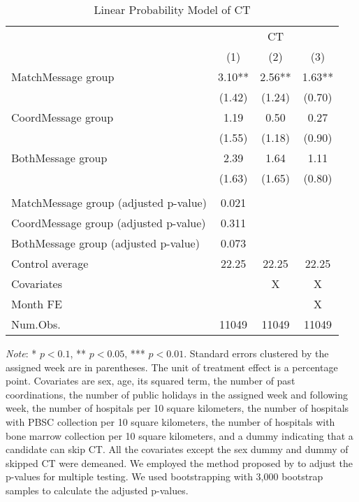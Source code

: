 \documentclass[12pt, a4paper]{article}
\begin{document}
\begin{table}[H]

\caption{\label{tab:lm-test}Linear Probability Model of CT}
\centering
\fontsize{8}{10}\selectfont
\begin{threeparttable}
\begin{tabular}[t]{>{\raggedright\arraybackslash}p{20em}ccc}
\toprule
\multicolumn{1}{c}{ } & \multicolumn{3}{c}{CT} \\
\cmidrule(l{3pt}r{3pt}){2-4}
  & (1) & (2) & (3)\\
\midrule
MatchMessage group & \num{3.10}** & \num{2.56}** & \num{1.63}**\\
 & (\num{1.42}) & (\num{1.24}) & (\num{0.70})\\
CoordMessage group & \num{1.19} & \num{0.50} & \num{0.27}\\
 & (\num{1.55}) & (\num{1.18}) & (\num{0.90})\\
BothMessage group & \num{2.39} & \num{1.64} & \num{1.11}\\
 & (\num{1.63}) & (\num{1.65}) & (\num{0.80})\\
\midrule
\addlinespace[0.3em]
\multicolumn{4}{l}{\textit{Adjustment of p-values for multiple hypotheses testing}}\\
\hspace{1em}MatchMessage group (adjusted p-value) & 0.021 &  & \\
\hspace{1em}CoordMessage group (adjusted p-value) & 0.311 &  & \\
\hspace{1em}BothMessage group (adjusted p-value) & 0.073 &  & \\
Control average & 22.25 & 22.25 & 22.25\\
Covariates &  & X & X\\
Month FE &  &  & X\\
Num.Obs. & \num{11049} & \num{11049} & \num{11049}\\
\bottomrule
\end{tabular}
\begin{tablenotes}
\item \emph{Note}: * $p < 0.1$, ** $p < 0.05$, *** $p < 0.01$. Standard errors clustered by the assigned week are in parentheses. The unit of treatment effect is a percentage point. Covariates are sex, age, its squared term, the number of past coordinations, the number of public holidays in the assigned week and following week, the number of hospitals per 10 square kilometers, the number of hospitals with PBSC collection per 10 square kilometers, the number of hospitals with bone marrow collection per 10 square kilometers, and a dummy indicating that a candidate can skip CT. All the covariates except the sex dummy and dummy of skipped CT were demeaned. We employed the method proposed by \citet{List2019} to adjust the p-values for multiple testing. We used bootstrapping with 3,000 bootstrap samples to calculate the adjusted p-values.
\end{tablenotes}
\end{threeparttable}
\end{table}
\end{document}
